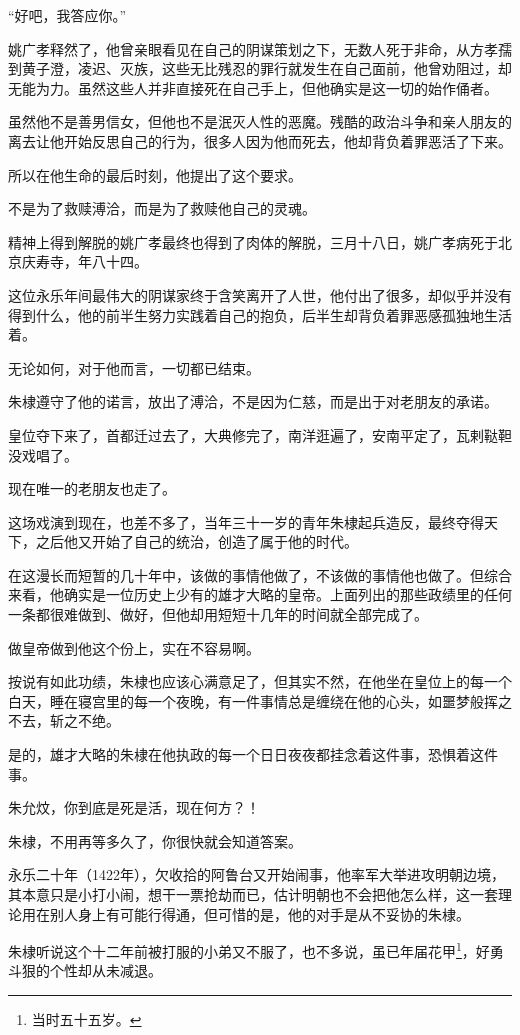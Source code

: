 \begin{multicols}{\theparacolNo}
“好吧，我答应你。”

姚广孝释然了，他曾亲眼看见在自己的阴谋策划之下，无数人死于非命，从方孝孺到黄子澄，凌迟、灭族，这些无比残忍的罪行就发生在自己面前，他曾劝阻过，却无能为力。虽然这些人并非直接死在自己手上，但他确实是这一切的始作俑者。

虽然他不是善男信女，但他也不是泯灭人性的恶魔。残酷的政治斗争和亲人朋友的离去让他开始反思自己的行为，很多人因为他而死去，他却背负着罪恶活了下来。

所以在他生命的最后时刻，他提出了这个要求。

不是为了救赎溥洽，而是为了救赎他自己的灵魂。

精神上得到解脱的姚广孝最终也得到了肉体的解脱，三月十八日，姚广孝病死于北京庆寿寺，年八十四。

这位永乐年间最伟大的阴谋家终于含笑离开了人世，他付出了很多，却似乎并没有得到什么，他的前半生努力实践着自己的抱负，后半生却背负着罪恶感孤独地生活着。

无论如何，对于他而言，一切都已结束。

朱棣遵守了他的诺言，放出了溥洽，不是因为仁慈，而是出于对老朋友的承诺。

皇位夺下来了，首都迁过去了，大典修完了，南洋逛遍了，安南平定了，瓦剌鞑靼没戏唱了。

现在唯一的老朋友也走了。

这场戏演到现在，也差不多了，当年三十一岁的青年朱棣起兵造反，最终夺得天下，之后他又开始了自己的统治，创造了属于他的时代。

在这漫长而短暂的几十年中，该做的事情他做了，不该做的事情他也做了。但综合来看，他确实是一位历史上少有的雄才大略的皇帝。上面列出的那些政绩里的任何一条都很难做到、做好，但他却用短短十几年的时间就全部完成了。

做皇帝做到他这个份上，实在不容易啊。

按说有如此功绩，朱棣也应该心满意足了，但其实不然，在他坐在皇位上的每一个白天，睡在寝宫里的每一个夜晚，有一件事情总是缠绕在他的心头，如噩梦般挥之不去，斩之不绝。

是的，雄才大略的朱棣在他执政的每一个日日夜夜都挂念着这件事，恐惧着这件事。

朱允炆，你到底是死是活，现在何方？！

朱棣，不用再等多久了，你很快就会知道答案。

永乐二十年（1422年），欠收拾的阿鲁台又开始闹事，他率军大举进攻明朝边境，其本意只是小打小闹，想干一票抢劫而已，估计明朝也不会把他怎么样，这一套理论用在别人身上有可能行得通，但可惜的是，他的对手是从不妥协的朱棣。

朱棣听说这个十二年前被打服的小弟又不服了，也不多说，虽已年届花甲\footnote{当时五十五岁。}，好勇斗狠的个性却从未减退。


\end{multicols}
